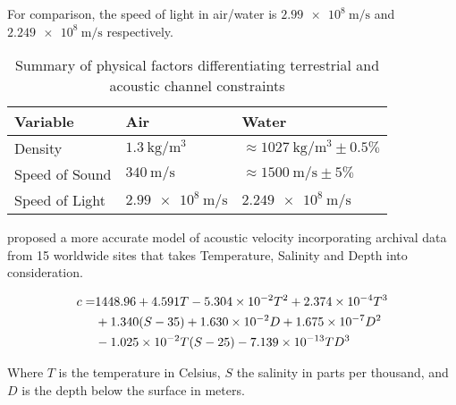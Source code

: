For comparison, the speed of light in air/water is $\SI{2.99e8}{\meter\per\second}$ and $\SI{2.249e8}{\meter\per\second}$ respectively. 

\begin{table}
	\centering
	\caption{Summary of physical factors differentiating terrestrial and acoustic channel constraints}
	\label{tab:channel_constraings_comp}
	\begin{tabularx}{0.8\textwidth}{X X X}\toprule
		Variable & Air & Water\\
		\midrule
		Density & $\SI{1.3}{\kilogram\per\meter\cubed}$ & $\approx\SI{1027}{\kilogram\per\meter\cubed}\pm0.5\%$ \\
		Speed of Sound & $\SI{340}{\meter\per\second}$ & $\approx\SI{1500}{\meter\per\second}\pm 5\%$ \\
		Speed of Light & $\SI{2.99e8}{\meter\per\second}$ & $\SI{2.249e8}{\meter\per\second}$\\
		\bottomrule
	\end{tabularx}
\end{table}
\citet{Mackenzie1981} proposed a more accurate model of acoustic velocity incorporating archival data from 15 worldwide sites that takes Temperature, Salinity and Depth into consideration.

\begin{align}
  c = & 1448.96 + 4.591 T - 5.304 \times 10^{-2} T^2 + 2.374 \times 10^{-4}T^{3}\notag\\
  & +1.340 (S-35) + 1.630\times 10^{-2}D+1.675\times 10^{-7}D^2\\
  & -1.025 \times 10^{-2}T(S-25) - 7.139\times 10^{-13}TD^3\notag
  \label{equ:mackenzie}
\end{align}

Where $T$ is the temperature in Celsius, $S$ the salinity in parts per thousand, and $D$ is the depth below the surface in meters.

